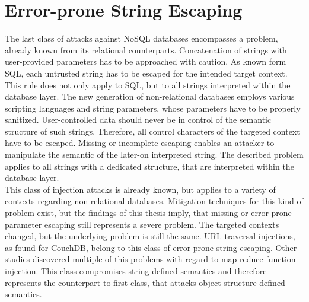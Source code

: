\section{Error-prone String Escaping}
The last class of attacks against NoSQL databases encompasses a problem, already known from its relational counterparts. Concatenation of strings with user-provided parameters has to be approached with caution. As known form SQL, each untrusted string has to be escaped for the intended target context. This rule does not only apply to SQL, but to all strings interpreted within the database layer. The new generation of non-relational databases employs various scripting languages and string parameters, whose parameters have to be properly sanitized. User-controlled data should never be in control of the semantic structure of such strings. Therefore, all control characters of the targeted context have to be escaped. Missing or incomplete escaping enables an attacker to manipulate the semantic of the later-on interpreted string. The described problem applies to all strings with a dedicated structure, that are interpreted within the database layer. \\

This class of injection attacks is already known, but applies to a variety of contexts regarding non-relational databases. Mitigation techniques for this kind of problem exist, but the findings of this thesis imply, that missing or error-prone parameter escaping still represents a severe problem. The targeted contexts changed, but the underlying problem is still the same. URL traversal injections, as found for CouchDB, belong to this class of error-prone string escaping. Other studies discovered multiple of this problems with regard to map-reduce function injection. This class compromises string defined semantics and therefore represents the counterpart to first class, that attacks object structure defined semantics.\\